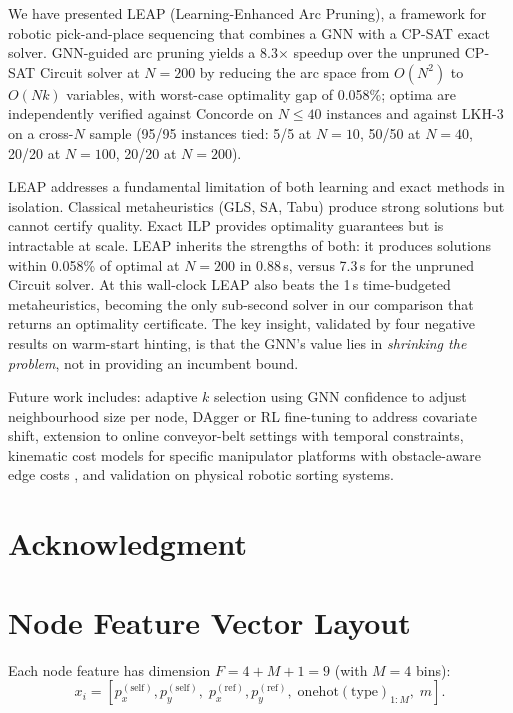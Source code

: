 \documentclass[conference]{IEEEtran}
\begin{document}
We have presented LEAP (Learning-Enhanced Arc Pruning), a framework for robotic pick-and-place sequencing that combines a GNN with a CP-SAT exact solver. GNN-guided arc pruning yields a 8.3$\times$ speedup over the unpruned CP-SAT Circuit solver at $N{=}200$ by reducing the arc space from $O(N^2)$ to $O(Nk)$ variables, with worst-case optimality gap of 0.058\%; optima are independently verified against Concorde \cite{applegate2006concorde} on $N\!\le\!40$ instances and against LKH-3 \cite{helsgaun2000lkh} on a cross-$N$ sample (95/95 instances tied: 5/5 at $N{=}10$, 50/50 at $N{=}40$, 20/20 at $N{=}100$, 20/20 at $N{=}200$).

LEAP addresses a fundamental limitation of both learning and exact methods in isolation. Classical metaheuristics (GLS, SA, Tabu) produce strong solutions but cannot certify quality. Exact ILP provides optimality guarantees but is intractable at scale. LEAP inherits the strengths of both: it produces solutions within 0.058\% of optimal at $N{=}200$ in 0.88\,s, versus 7.3\,s for the unpruned Circuit solver. At this wall-clock LEAP also beats the 1\,s time-budgeted metaheuristics, becoming the only sub-second solver in our comparison that returns an optimality certificate. The key insight, validated by four negative results on warm-start hinting, is that the GNN's value lies in \emph{shrinking the problem}, not in providing an incumbent bound.

Future work includes: adaptive $k$ selection using GNN confidence to adjust neighbourhood size per node, DAgger \cite{ross2011dagger} or RL fine-tuning to address covariate shift, extension to online conveyor-belt settings with temporal constraints, kinematic cost models for specific manipulator platforms \cite{han2020pap} with obstacle-aware edge costs \cite{ojha2025obstacle}, and validation on physical robotic sorting systems.

\section*{Acknowledgment}

\appendices
\section{Node Feature Vector Layout}\label{app:features}

Each node feature has dimension $F = 4 + M + 1 = 9$ (with $M{=}4$ bins):
\begin{equation}
x_i = [p^{(\text{self})}_x, p^{(\text{self})}_y,\; p^{(\text{ref})}_x, p^{(\text{ref})}_y,\; \text{onehot}(\text{type})_{1:M},\; m].
\end{equation}
\end{document}
